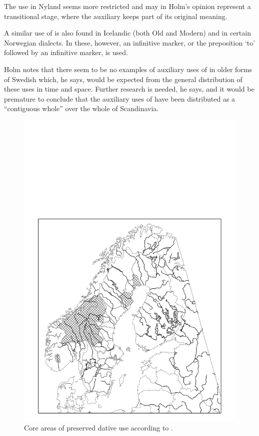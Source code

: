 The use in Nyland seems more restricted and may in Holm’s opinion represent a transitional stage, where the auxiliary keeps part of its original meaning. 

A similar use of  is also found in Icelandic (both Old and Modern) and in certain Norwegian dialects. In these, however, an infinitive marker, or the preposition  ‘to’ followed by an infinitive marker, is used. 

Holm notes that there seem to be no examples of auxiliary uses of  in older forms of Swedish which, he says, would be expected from the general distribution of these uses in time and space. Further research is needed, he says, and it would be premature to conclude that the auxiliary uses of  have been distributed as a “contiguous whole” over the whole of Scandinavia.

\begin{figure}[h]

\includegraphics[height=.5\textheight]{figures/33_CoreAreasReinhammer}
\caption{Core areas of preserved dative use according to \citet{Reinhammar1973}.}
\label{map:29}

\end{figure}

